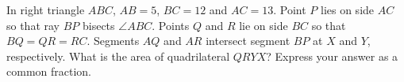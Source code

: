 In right triangle $ABC$, $AB=5$, $BC=12$ and $AC=13$. Point $P$ lies on side $AC$ so that ray $BP$ bisects $\angle ABC$. Points $Q$ and $R$ lie on side $BC$ so that $BQ=QR=RC$. Segments $AQ$ and $AR$ intersect segment $BP$ at $X$ and $Y$, respectively. What is the area of quadrilateral $QRYX$? Express your answer as a common fraction.
